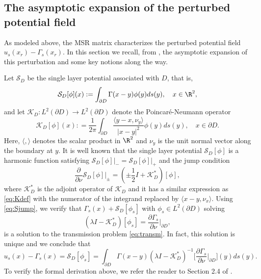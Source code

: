 \subsection{The asymptotic expansion of the perturbed potential field}

As modeled above, the MSR matrix characterizes the perturbed
potential field $u_s(x_r) - \Gamma_s(x_r)$. In this section we
recall, from \cite{ammari2004reconstruction},  the asymptotic expansion of this
perturbation and some key notions along the way.

Let $\mathcal{S}_D$ be the single layer potential associated with
$D$, that is,
\begin{equation}
\mathcal{S}_D[\phi](x) :  = \int_{\partial D} \Gamma(x-y) \phi(y)
ds(y), \quad x \in \R^2,
\end{equation}
and let $\mathcal{K}_D: L^2(\partial D) \to L^2(\partial D)$
denote the Poincar\'e-Neumann operator
\begin{equation}
\mathcal{K}_D[\phi] (x) : = \frac{1}{2 \pi} \int_{\partial D}
\frac{\langle y - x, \nu_y\rangle}{|x-y|^2} \phi(y) ds(y), \quad x
\in \partial D. \label{eq:Kdef}
\end{equation}
Here, $\langle , \rangle$ denotes the scalar product in $\R^2$ and
$\nu_y$ is the unit normal vector along the boundary at $y$. It is
well known that the single layer potential $\mathcal{S}_D[\phi]$
is a harmonic function satisfying $\mathcal{S}_D[\phi]\big|_- =
\mathcal{S}_D[\phi]\big|_+$ and the jump condition
\begin{equation}
\frac{\partial}{\partial \nu} \mathcal{S}_D[\phi] \Big|_{\pm} =
\left( \pm \frac{1}{2} I + \mathcal{K}_D^*  \right)[\phi],
\label{eq:Sjump}
\end{equation}
where $\mathcal{K}_D^*$ is the adjoint operator of $\mathcal{K}_D$
and it has a similar expression as \eqref{eq:Kdef} with the
numerator of the integrand replaced by $\langle x - y,
\nu_x\rangle$. Using \eqref{eq:Sjump}, we verify that $\Gamma_s(x)
+ \mathcal{S}_D[\phi_s]$ with $\phi_s \in L^2(\partial D)$ solving
\begin{equation}
\left( \lambda I - \mathcal{K}_D^* \right)[\phi_s] =
\frac{\partial \Gamma_s}{\partial \nu} \Big|_{\partial D},
\end{equation}
is a solution to the transmission problem \eqref{eq:transm}. In
fact, this solution is unique and we conclude that
\begin{equation}
u_s(x) - \Gamma_s(x) = \mathcal{S}_D[\phi_s] = \int_{\partial D}
\Gamma(x - y) (\lambda I - \mathcal{K}_D^*)^{-1}
\bigg[\frac{\partial \Gamma_s}{\partial \nu}\Big|_{\partial D}
\bigg](y)  ds(y). \label{eq:dfield}
\end{equation}
To verify the formal derivation above, we refer the reader to
Section 2.4 of \cite{ammari2004reconstruction}.

